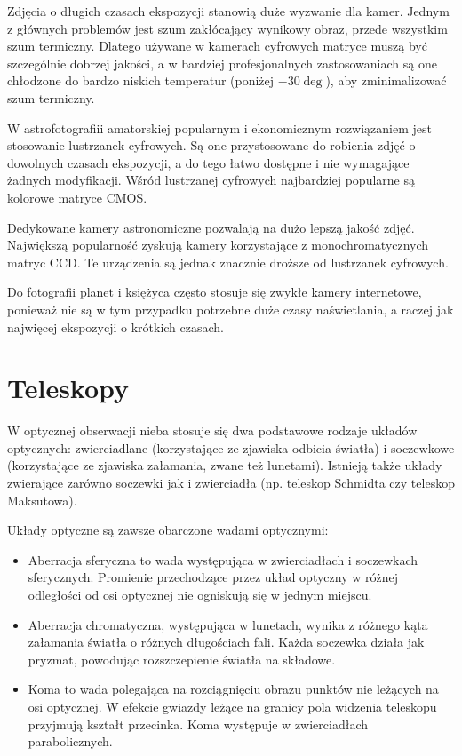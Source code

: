 Zdjęcia o długich czasach ekspozycji stanowią duże wyzwanie dla kamer. Jednym
z głównych problemów jest szum zakłócający wynikowy obraz, przede wszystkim szum
termiczny. Dlatego używane w kamerach cyfrowych matryce muszą być szczególnie
dobrzej jakości, a w bardziej profesjonalnych zastosowaniach są one chłodzone do
bardzo niskich temperatur (poniżej $-30\deg$), aby zminimalizować szum
termiczny.

W astrofotografiii amatorskiej popularnym i ekonomicznym rozwiązaniem jest
stosowanie lustrzanek cyfrowych. Są one przystosowane do robienia zdjęć
o dowolnych czasach ekspozycji, a do tego łatwo dostępne i nie wymagające
żadnych modyfikacji. Wśród lustrzanej cyfrowych najbardziej popularne są
kolorowe matryce CMOS.

Dedykowane kamery astronomiczne pozwalają na dużo lepszą jakość zdjęć.
Największą popularność zyskują kamery korzystające z monochromatycznych matryc
CCD. Te urządzenia są jednak znacznie droższe od lustrzanek cyfrowych.

Do fotografii planet i księżyca często stosuje się zwykłe kamery internetowe,
ponieważ nie są w tym przypadku potrzebne duże czasy naświetlania, a raczej jak
najwięcej ekspozycji o krótkich czasach.

\section{Teleskopy}

W optycznej obserwacji nieba stosuje się dwa podstawowe rodzaje układów
optycznych: zwierciadlane (korzystające ze zjawiska odbicia światła)
i soczewkowe (korzystające ze zjawiska załamania, zwane też lunetami). Istnieją
także układy zwierające zarówno soczewki jak i zwierciadła (np. teleskop
Schmidta czy teleskop Maksutowa). 

Układy optyczne są zawsze obarczone wadami optycznymi:

\begin{itemize}

	\item Aberracja sferyczna to wada występująca w zwierciadłach
		i soczewkach sferycznych. Promienie przechodzące przez układ
		optyczny w różnej odległości od osi optycznej nie ogniskują się
		w jednym miejscu.
	
	\item Aberracja chromatyczna, występująca w lunetach, wynika z różnego
		kąta załamania światła o różnych długościach fali. Każda
		soczewka działa jak pryzmat, powodując rozszczepienie światła na
		składowe.

	\item Koma to wada polegająca na rozciągnięciu obrazu punktów nie
		leżących na osi optycznej. W efekcie gwiazdy leżące na granicy
		pola widzenia teleskopu przyjmują kształt przecinka. Koma
		występuje w zwierciadłach parabolicznych.

\end{itemize}


